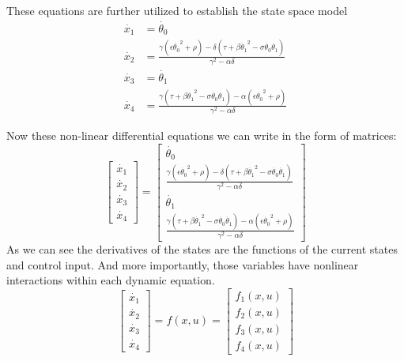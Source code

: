These equations are further utilized to establish the state
space model
\begin{subequations}
	\begin{align}
\dot{x_1} &= \dot{\theta_0} \\
\dot{x_2} &= \frac{\gamma(\epsilon\dot{\theta_0}^2+\rho)-\delta(\tau+\beta\dot{\theta_1}^2-\sigma\dot{\theta_0}\dot{\theta_1})}{\gamma^2-\alpha\delta}\\
\dot{x_3} &= \dot{\theta_1}\\
\dot{x_4} &= \frac{\gamma(\tau+\beta\dot{\theta_1}^2-\sigma\dot{\theta_0}\dot{\theta_1})-\alpha(\epsilon\dot{\theta_0}^2+\rho)}{\gamma^2-\alpha\delta}
	\end{align}
\end{subequations}

Now these non-linear differential equations we can write in the form of matrices:
\begin{equation}\label{nonlinmodel}
\begin{bmatrix}
\dot{x_1} \\ \dot{x_2} \\ \dot{x_3} \\ \dot{x_4}
\end{bmatrix} = \begin{bmatrix}
\dot{\theta_0}\\
\frac{\gamma(\epsilon\dot{\theta_0}^2+\rho)-\delta(\tau+\beta\dot{\theta_1}^2-\sigma\dot{\theta_0}\dot{\theta_1})}{\gamma^2-\alpha\delta}\\
\dot{\theta_1}\\
 \frac{\gamma(\tau+\beta\dot{\theta_1}^2-\sigma\dot{\theta_0}\dot{\theta_1})-\alpha(\epsilon\dot{\theta_0}^2+\rho)}{\gamma^2-\alpha\delta}
\end{bmatrix}
\end{equation}
As we can see the derivatives of the states are the functions of the current states and control input. And more importantly, those variables have nonlinear interactions within each dynamic equation. 
\begin{equation}\begin{bmatrix}
\dot{x_1} \\ \dot{x_2} \\ \dot{x_3} \\ \dot{x_4}
\end{bmatrix} = f(x,u) =\begin{bmatrix}f_1(x,u)\\f_2(x,u)\\f_3(x,u)\\f_4(x,u)\end{bmatrix} \end{equation}

